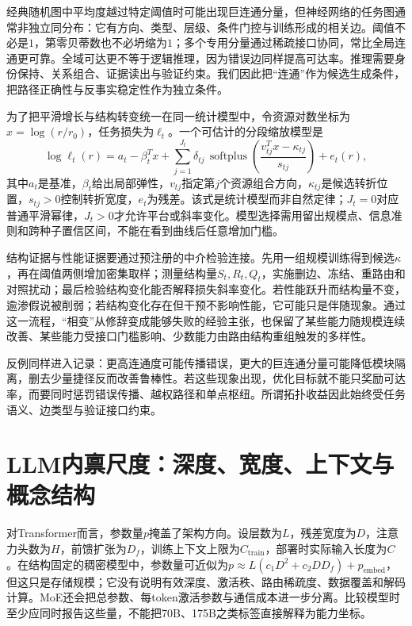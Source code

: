 经典随机图中平均度越过特定阈值时可能出现巨连通分量，但神经网络的任务图通常非独立同分布：它有方向、类型、层级、条件门控与训练形成的相关边。阈值不必是$1$，第零贝蒂数也不必坍缩为$1$；多个专用分量通过稀疏接口协同，常比全局连通更可靠。全域可达更不等于逻辑推理，因为错误边同样提高可达率。推理需要身份保持、关系组合、证据读出与验证约束。我们因此把“连通”作为候选生成条件，把路径正确性与反事实稳定性作为独立条件。

为了把平滑增长与结构转变统一在同一统计模型中，令资源对数坐标为$x=\log(r/r_0)$，任务损失为$\ell_t$。一个可估计的分段缩放模型是
\begin{equation}
\log \ell_t(r)=a_t-\beta_t^T x+
\sum_{j=1}^{J_t}\delta_{tj}\,\operatorname{softplus}
\!\left(\frac{v_{tj}^Tx-\kappa_{tj}}{s_{tj}}\right)+e_t(r),
\label{eq:unified_scaling}
\end{equation}
其中$a_t$是基准，$\beta_t$给出局部弹性，$v_{tj}$指定第$j$个资源组合方向，$\kappa_{tj}$是候选转折位置，$s_{tj}>0$控制转折宽度，$e_t$为残差。该式是统计模型而非自然定律；$J_t=0$对应普通平滑幂律，$J_t>0$才允许平台或斜率变化。模型选择需用留出规模点、信息准则和跨种子置信区间，不能在看到曲线后任意增加门槛。

结构证据与性能证据要通过预注册的中介检验连接。先用一组规模训练得到候选$\kappa$，再在阈值两侧增加密集取样；测量结构量$S_t,R_t,Q_t$，实施删边、冻结、重路由和对照扰动；最后检验结构变化能否解释损失斜率变化。若性能跃升而结构量不变，逾渗假说被削弱；若结构变化存在但干预不影响性能，它可能只是伴随现象。通过这一流程，“相变”从修辞变成能够失败的经验主张，也保留了某些能力随规模连续改善、某些能力受接口门槛影响、少数能力由路由结构重组触发的多样性。

反例同样进入记录：更高连通度可能传播错误，更大的巨连通分量可能降低模块隔离，删去少量捷径反而改善鲁棒性。若这些现象出现，优化目标就不能只奖励可达率，而要同时惩罚错误传播、越权路径和单点枢纽。所谓拓扑收益因此始终受任务语义、边类型与验证接口约束。

\section{LLM内禀尺度：深度、宽度、上下文与概念结构}
\label{sec:geometric_definition_of_llm_scale}
\label{sec:rigorous_topology_of_n_and_d}

对Transformer而言，参数量$p$掩盖了架构方向。设层数为$L$，残差宽度为$D$，注意力头数为$H$，前馈扩张为$D_f$，训练上下文上限为$C_{\mathrm{train}}$，部署时实际输入长度为$C$。在结构固定的稠密模型中，参数量可近似为$p\approx L(c_1D^2+c_2DD_f)+p_{\mathrm{embed}}$，但这只是存储规模；它没有说明有效深度、激活秩、路由稀疏度、数据覆盖和解码计算。MoE还会把总参数、每token激活参数与通信成本进一步分离。比较模型时至少应同时报告这些量，不能把70B、175B之类标签直接解释为能力坐标。

